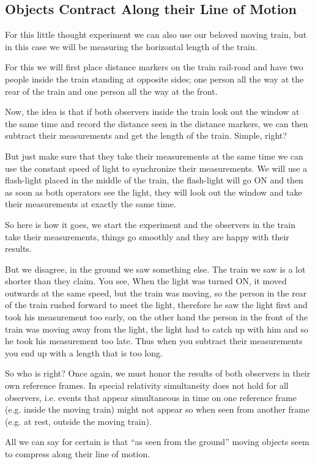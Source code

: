 \documentclass[12pt, letterpaper]{article}
\begin{document}
    \subsection*{Objects Contract Along their Line of Motion}
    For this little thought experiment we can also use our beloved moving train, 
    but in this case we will be measuring the horizontal length of the train.
    
    For this we will first place distance markers on the train rail-road 
    and have two people inside the train standing at opposite sides; one person 
    all the way at the rear of the train and one person all the way at the 
    front. 
    
    Now, the idea is that if both observers inside the train look out the 
    window at the same time and record the distance seen in the 
    distance markers, we can then subtract their measurements and get the 
    length of the train. Simple, right?
    
    But just make sure that they take their measurements 
    at the same time we can use the constant speed of light to 
    synchronize their measurements. We will use a flash-light placed in the 
    middle of the train, the flash-light will go ON and then as soon as both 
    operators see the light, they will look out the window and take their 
    measurements at exactly the same time. 
    
    So here is how it goes, we start the experiment and the observers in 
    the train take their measurements, things go smoothly and they are 
    happy with their results. 
    
    But we disagree, in the ground we saw something else. The train we saw is a 
    lot shorter than they claim. You see, When the light was turned ON, 
    it moved outwards at the same speed, but the train was moving, 
    so the person in the rear of the train rushed forward to meet the light, 
    therefore he saw the light first and took his measurement too early, 
    on the other hand the person in the front of the train was moving 
    away from the light, the light had to catch up with him and so he 
    took his measurement too late. Thus when you subtract their measurements 
    you end up with a length that is too long. 
    
    \medskip
    So who is right?
    Once again, we must honor the results of both observers in their own 
    reference frames. In special relativity simultaneity does not hold for 
    all observers, i.e. events that appear simultaneous in time on one 
    reference frame (e.g. inside the moving train) might not appear so when 
    seen from another frame (e.g. at rest, outside the moving train). 
    
    
    All we can say for certain is that ``as seen from the ground'' moving objects seem 
    to compress along their line of motion.
    
\end{document}
